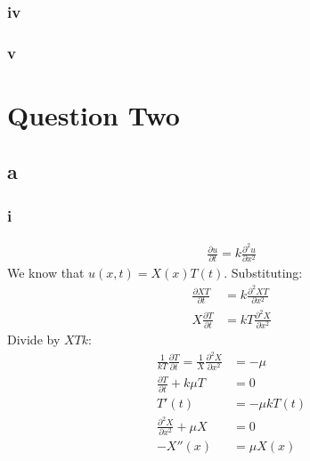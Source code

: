 \documentclass[11pt]{article}
\numberwithin{equation}{section}
\begin{document}
\subsubsection*{iv}
\subsubsection*{v}
\section{Question Two}
\subsection*{a}
\subsubsection*{i}
\begin{align}
	\frac{\partial u}{\partial t} = k \frac{\partial^2 u}{\partial x^2}\label{PDEq2ai}
\end{align}
We know that $u(x,t) = X(x)T(t)$. Substituting:
\begin{align}
	\frac{\partial XT}{\partial t} &= k\frac{\partial^2 XT}{\partial x^2}\\
	X\frac{\partial T}{\partial t} &= kT\frac{\partial^2 X}{\partial x^2}
\end{align}
Divide by $XTk$:
\begin{align}
	\frac{1}{kT}\frac{\partial T}{\partial t} = \frac{1}{X}\frac{\partial^2 X}{\partial x^2} &= -\mu\\
	\frac{\partial T}{\partial t} + k\mu T &= 0\\
	T'(t) &= -\mu k T(t) \label{TPDE}\\
	\frac{\partial^2 X}{\partial x^2} + \mu X &= 0\\
	-X''(x) &= \mu X(x)
\end{align}
\end{document}
